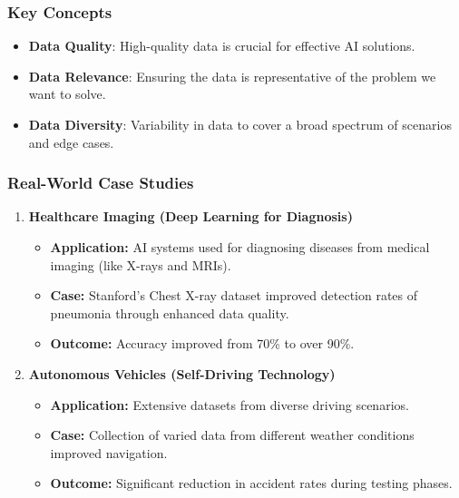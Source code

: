 \documentclass[aspectratio=169]{beamer}
\begin{document}
\begin{frame}[fragile]
    \frametitle{Key Concepts}
    \begin{itemize}
        \item \textbf{Data Quality}: High-quality data is crucial for effective AI solutions.
        \item \textbf{Data Relevance}: Ensuring the data is representative of the problem we want to solve.
        \item \textbf{Data Diversity}: Variability in data to cover a broad spectrum of scenarios and edge cases.
    \end{itemize}
\end{frame}

\begin{frame}[fragile]
    \frametitle{Real-World Case Studies}
    \begin{enumerate}
        \item \textbf{Healthcare Imaging (Deep Learning for Diagnosis)}
            \begin{itemize}
                \item \textbf{Application:} AI systems used for diagnosing diseases from medical imaging (like X-rays and MRIs).
                \item \textbf{Case:} Stanford’s Chest X-ray dataset improved detection rates of pneumonia through enhanced data quality.
                \item \textbf{Outcome:} Accuracy improved from 70\% to over 90\%.
            \end{itemize}
        \item \textbf{Autonomous Vehicles (Self-Driving Technology)}
            \begin{itemize}
                \item \textbf{Application:} Extensive datasets from diverse driving scenarios.
                \item \textbf{Case:} Collection of varied data from different weather conditions improved navigation.
                \item \textbf{Outcome:} Significant reduction in accident rates during testing phases.
            \end{itemize}
    \end{enumerate}
\end{frame}
\end{document}
